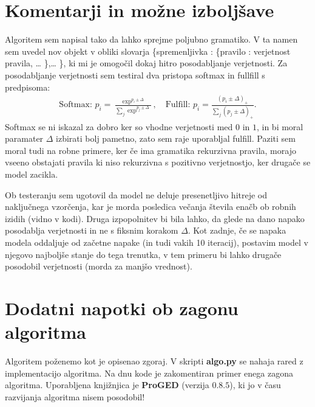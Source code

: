 \documentclass[12pt]{article}
\begin{document}
\section{Komentarji in možne izboljšave}
Algoritem sem napisal tako da lahko sprejme poljubno gramatiko. V ta namen sem uvedel nov 
objekt v obliki slovarja 
\{spremenljivka : \{pravilo : verjetnost pravila, \dots
    \},\dots
\}, ki mi je omogočil dokaj hitro posodabljanje verjetnosti.
Za posodabljanje verjetnosti sem testiral dva pristopa softmax in fullfill s predpisoma:
\begin{align*}
   \text{Softmax: } p_i = \frac{\exp^{p_i \pm \Delta}}{\sum_{j}{\exp^{p_j \pm \Delta}}}, \quad
   \text{Fulfill: } p_i = \frac{(p_i \pm \Delta)_{+}}{\sum_{j}{(p_j \pm \Delta)_{+}}}.
\end{align*}
Softmax se ni iskazal za dobro ker so vhodne verjetnosti med $0$ in $1$, in  bi moral 
paramater 
$\Delta$ izbirati bolj pametno, zato sem raje uporabljal fulfill. Paziti sem moral tudi 
na robne primere, ker če ima gramatika rekurzivna pravila, morajo vseeno obstajati pravila 
ki niso rekurzivna s pozitivno verjetnostjo, ker drugače se model zacikla.

Ob testeranju sem ugotovil da model ne deluje presenetljivo hitreje od naključnega vzorčenja, 
kar je morda posledica večanja števila enačb ob robnih izidih (vidno v kodi). Druga izpopolnitev
bi bila lahko, da glede na dano napako posodablja verjetnosti in ne s fiksnim korakom $\Delta$.
Kot zadnje, če se napaka modela oddaljuje od začetne napake (in tudi vakih 10 iteracij), 
postavim model v njegovo najboljše stanje do tega trenutka,
v tem primeru bi lahko drugače posodobil verjetnosti (morda za manjšo vrednost).


\section*{Dodatni napotki ob zagonu algoritma}
Algoritem poženemo kot je opisenao zgoraj. V skripti \textbf{algo.py} se nahaja rared 
z implementacijo algoritma. Na dnu kode je zakomentiran primer enega zagona algoritma.
Uporabljena knjižnjica je \textbf{ProGED} (verzija $0.8.5$), ki jo v času razvijanja 
algoritma nisem posodobil!
\end{document}
